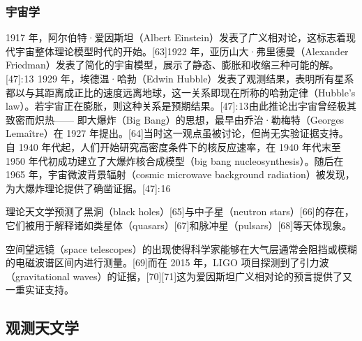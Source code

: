 \subsubsection{宇宙学}
1917 年，阿尔伯特·爱因斯坦（Albert Einstein）发表了广义相对论，这标志着现代宇宙整体理论模型时代的开始。[63]1922 年，亚历山大·弗里德曼（Alexander Friedman）发表了简化的宇宙模型，展示了静态、膨胀和收缩三种可能的解。[47]: 13  1929 年，埃德温·哈勃（Edwin Hubble）发表了观测结果，表明所有星系都以与其距离成正比的速度远离地球，这一关系即现在所称的哈勃定律（Hubble’s law）。若宇宙正在膨胀，则这种关系是预期结果。[47]: 13 由此推论出宇宙曾经极其致密而炽热—— 即大爆炸（Big Bang）的思想，最早由乔治·勒梅特（Georges Lemaître）在 1927 年提出。[64]当时这一观点虽被讨论，但尚无实验证据支持。自 1940 年代起，人们开始研究高密度条件下的核反应速率，在 1940 年代末至 1950 年代初成功建立了大爆炸核合成模型（big bang nucleosynthesis）。随后在 1965 年，宇宙微波背景辐射（cosmic microwave background radiation）被发现，为大爆炸理论提供了确凿证据。[47]: 16   

理论天文学预测了黑洞（black holes）[65]与中子星（neutron stars）[66]的存在，  
它们被用于解释诸如类星体（quasars）[67]和脉冲星（pulsars）[68]等天体现象。  

空间望远镜（space telescopes）的出现使得科学家能够在大气层通常会阻挡或模糊的电磁波谱区间内进行测量。[69]而在 2015 年，LIGO 项目探测到了引力波（gravitational waves）的证据，[70][71]这为爱因斯坦广义相对论的预言提供了又一重实证支持。
\subsection{观测天文学}

